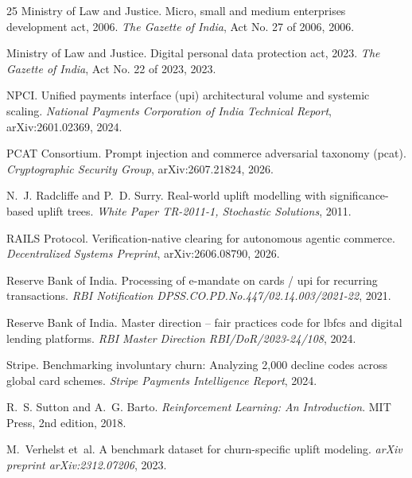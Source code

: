 \documentclass[10pt, twocolumn, a4paper]{article}
\begin{document}
\begin{thebibliography}{25}
{Ministry of Law and Justice}.
\newblock Micro, small and medium enterprises development act, 2006.
\newblock \emph{The Gazette of India}, Act No. 27 of 2006, 2006.

{Ministry of Law and Justice}.
\newblock Digital personal data protection act, 2023.
\newblock \emph{The Gazette of India}, Act No. 22 of 2023, 2023.

NPCI.
\newblock Unified payments interface (upi) architectural volume and systemic scaling.
\newblock \emph{National Payments Corporation of India Technical Report}, arXiv:2601.02369, 2024.

{PCAT Consortium}.
\newblock Prompt injection and commerce adversarial taxonomy (pcat).
\newblock \emph{Cryptographic Security Group}, arXiv:2607.21824, 2026.

N.~J. Radcliffe and P.~D. Surry.
\newblock Real-world uplift modelling with significance-based uplift trees.
\newblock \emph{White Paper TR-2011-1, Stochastic Solutions}, 2011.

{RAILS Protocol}.
\newblock Verification-native clearing for autonomous agentic commerce.
\newblock \emph{Decentralized Systems Preprint}, arXiv:2606.08790, 2026.

{Reserve Bank of India}.
\newblock Processing of e-mandate on cards / upi for recurring transactions.
\newblock \emph{RBI Notification DPSS.CO.PD.No.447/02.14.003/2021-22}, 2021.

{Reserve Bank of India}.
\newblock Master direction -- fair practices code for lbfcs and digital lending platforms.
\newblock \emph{RBI Master Direction RBI/DoR/2023-24/108}, 2024.

{Stripe}.
\newblock Benchmarking involuntary churn: Analyzing 2,000 decline codes across global card schemes.
\newblock \emph{Stripe Payments Intelligence Report}, 2024.

R.~S. Sutton and A.~G. Barto.
\newblock \emph{Reinforcement Learning: An Introduction}.
\newblock MIT Press, 2nd edition, 2018.

M.~Verhelst et~al.
\newblock A benchmark dataset for churn-specific uplift modeling.
\newblock \emph{arXiv preprint arXiv:2312.07206}, 2023.

\end{thebibliography}
\end{document}
